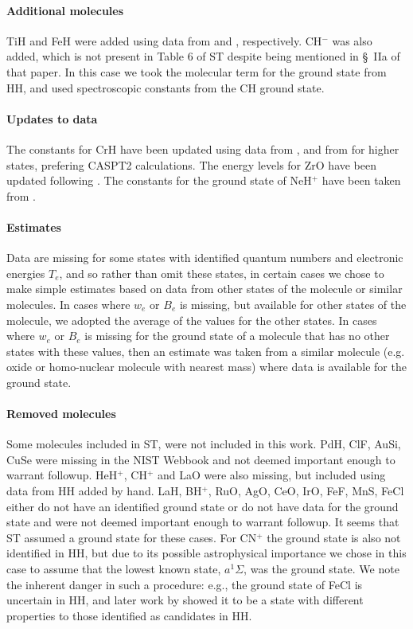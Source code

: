 \documentclass[traditabstract]{aa} %
\begin{document}
\paragraph{Additional molecules}    TiH and FeH were added using data from \cite{2005ApJ...624..988B} and \cite{2003ApJ...594..651D}, respectively.  CH$^-$ was also added, which is not present in Table 6 of ST despite being mentioned in \S~IIa of that paper.  In this case we took the molecular term for the ground state from HH, and used spectroscopic constants from the CH ground state.

\paragraph{Updates to data}  The constants for CrH have been updated using data from \citet[][Table II]{2001JChPh.115.1312B}, and from \cite{2004JChPh.121.8194G} for higher states, prefering CASPT2 calculations.  The energy levels for ZrO have been updated following \cite{1988ApJ...332.1090D}.  The constants for the ground state of NeH$^+$ have been taken from \cite{civis_new_2004}.

\paragraph{Estimates}  Data are missing for some states with identified quantum numbers and electronic energies $T_e$, and so rather than omit these states, in certain cases we chose to make simple estimates based on data from other states of the molecule or similar molecules.  In cases where $w_e$ or $B_e$ is missing, but available for other states of the molecule, we adopted the average of the values for the other states.  In cases where  $w_e$ or $B_e$ is missing for the ground state of a molecule that has no other states with these values, then an estimate was taken from a similar molecule (e.g. oxide or homo-nuclear molecule with nearest mass) where data is available for the ground state.  

\paragraph{Removed molecules}  Some molecules included in ST, were not included in this work.  PdH, ClF, AuSi, CuSe were missing in the NIST Webbook and not deemed important enough to warrant followup.  HeH$^+$, CH$^+$ and LaO were also missing, but included using data from HH added by hand.  LaH, BH$^+$, RuO, AgO, CeO, IrO, FeF, MnS, FeCl either do not have an identified ground state or do not have data for the ground state and were not deemed important enough to warrant followup.  It seems that ST assumed a ground state for these cases. For CN$^+$ the ground state is also not identified in HH, but due to its possible astrophysical importance we chose in this case to assume that the lowest known state, $a ^1 \Sigma$, was the ground state.  We note the inherent danger in such a procedure:  e.g., the ground state of FeCl is uncertain in HH, and later work by \cite{0022-3700-13-24-010} showed it to be a state with different properties to those identified as candidates in HH.
\end{document}
